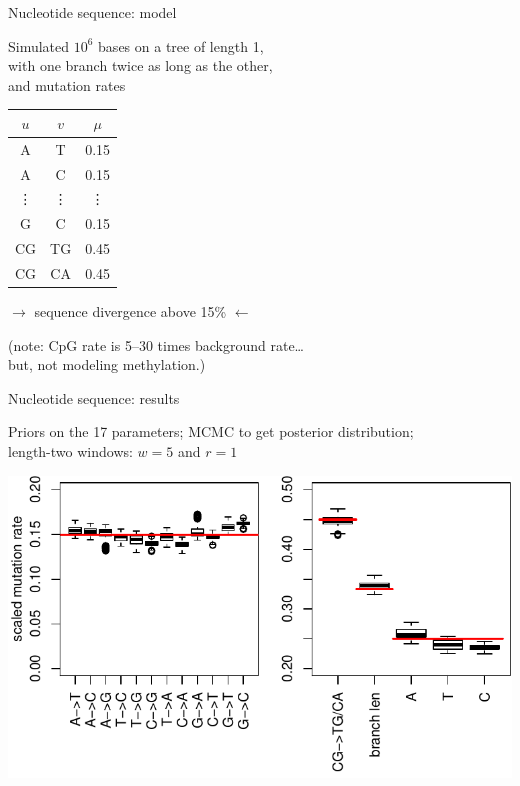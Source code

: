 \documentclass[smaller]{beamer}
\begin{document}
\begin{frame}{Nucleotide sequence: model}

  Simulated $10^6$ bases on a tree of length 1, \\
  with one branch twice as long as the other,\\
  and mutation rates
  {\small
  \begin{center}
    \begin{tabular}{c@{\quad$\to$\quad}c@{\quad at rate\quad }c}
      $u$  &  $v$  &  $\mu$  \\
      \hline
       A & T   &  0.15  \\
       A & C   &  0.15  \\
       \vdots & \vdots & \vdots \\
       G & C &  0.15  \\
      CG   &  TG   &  0.45 \\
      CG   &  CA   &  0.45 
    \end{tabular}
  \end{center}
  }

  \vspace{2em}

  $\longrightarrow$ sequence divergence above 15\% $\longleftarrow$
  
  \vspace{2em}

  ({\struct note:} CpG rate is 5--30 times background rate\ldots\\
  \hspace{3em} but, not modeling methylation.)

\end{frame}

\begin{frame}{Nucleotide sequence: results}

  Priors on the 17 parameters; MCMC to get posterior distribution;\\
  \hspace{2em} length-two windows: $w=5$ and $r=1$

  \begin{center}
\includegraphics[width=\textwidth]{../../../writeup-plots/selsims-2013-06-03-13-17-0187525-estimate-boxplots}
\end{center}

\end{frame}
\end{document}
